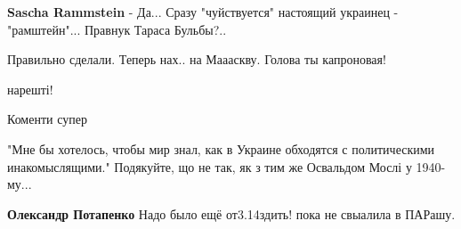 \begin{itemize}
\begin{itemize}
 
\textbf{Sascha Rammstein} - Да... Сразу "чуйствуется" настоящий украинец - "рамштейн"... Правнук Тараса Бульбы?..
\end{itemize}

 
Правильно сделали. Теперь нах.. на Маааскву. Голова ты капроновая!

 
нарешті!

 
Коменти супер

 

"Мне бы хотелось, чтобы мир знал, как в Украине обходятся с политическими
инакомыслящими." Подякуйте, що не так, як з тим же Освальдом Мослі у 1940-му...

\begin{itemize}
 
\textbf{Олександр Потапенко} Надо было ещё от3.14здить! пока не свыалила в ПАРашу.

 

\end{itemize}
\end{itemize}
